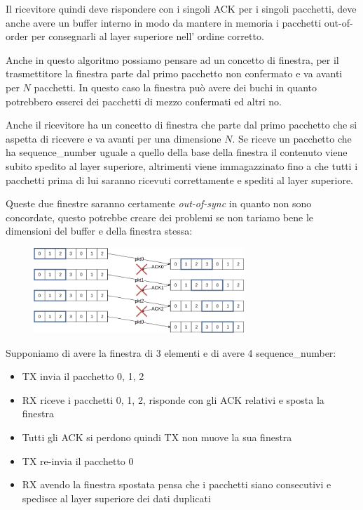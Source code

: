 Il ricevitore quindi deve rispondere con i singoli ACK per i singoli pacchetti, deve anche avere un buffer interno in modo da mantere in memoria i pacchetti out-of-order per consegnarli al layer superiore nell' ordine corretto.

Anche in questo algoritmo possiamo pensare ad un concetto di finestra, per il trasmettitore la finestra parte dal primo pacchetto non confermato e va avanti per $N$ pacchetti.
In questo caso la finestra può avere dei buchi in quanto potrebbero esserci dei pacchetti di mezzo confermati ed altri no.

Anche il ricevitore ha un concetto di finestra che parte dal primo pacchetto che si aspetta di ricevere e va avanti per una dimensione $N$.
Se riceve un pacchetto che ha sequence\_number uguale a quello della base della finestra il contenuto viene subito spedito al layer superiore, altrimenti viene immagazzinato fino a che tutti i pacchetti prima di lui saranno ricevuti correttamente e spediti al layer superiore.


Queste due finestre saranno certamente \emph{out-of-sync} in quanto non sono concordate, questo potrebbe creare dei problemi se non tariamo bene le dimensioni del buffer e della finestra stessa:
\begin{figure}[H]
    \centering
    \includegraphics[width=300px]{images/3_Reti_connessione_diretta/window-desync.png}
\end{figure}
Supponiamo di avere la finestra di 3 elementi e di avere 4 sequence\_number:
\begin{itemize}
    \item TX invia il pacchetto 0, 1, 2
    \item RX riceve i pacchetti 0, 1, 2, risponde con gli ACK relativi e sposta la finestra
    \item Tutti gli ACK si perdono quindi TX non muove la sua finestra
    \item TX re-invia il pacchetto 0
    \item RX avendo la finestra spostata pensa che i pacchetti siano consecutivi e spedisce al layer superiore dei dati duplicati 
\end{itemize}

